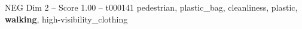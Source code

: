 \begin{textsample}{NEG Dim 2 – Score 1.00 – t000141}  \label{ex:f2_neg_037}
pedestrian, plastic\_bag, cleanliness, plastic, \textbf{walking}, high-visibility\_clothing

\end{textsample}
